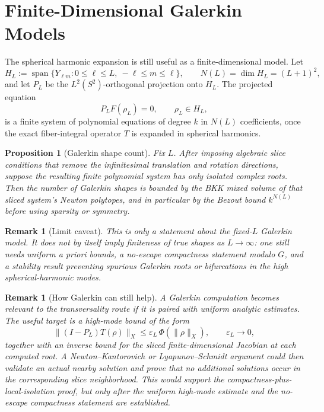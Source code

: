 \documentclass[12pt]{article}
\newtheorem{proposition}[theorem]{Proposition}
\newtheorem{remark}[theorem]{Remark}
\begin{document}
\section{Finite-Dimensional Galerkin Models}

The spherical harmonic expansion is still useful as a finite-dimensional
model. Let
\[
  H_L := \operatorname{span}\{Y_{\ell m}:0\leq \ell\leq L,\ -\ell\leq m\leq \ell\},
  \qquad N(L)=\dim H_L=(L+1)^2,
\]
and let $P_L$ be the $L^2(S^2)$-orthogonal projection onto $H_L$. The projected
equation
\[
  P_LF(\rho_L)=0,\qquad \rho_L\in H_L,
\]
is a finite system of polynomial equations of degree $k$ in $N(L)$
coefficients, once the exact fiber-integral operator $T$ is expanded in
spherical harmonics.

\begin{proposition}[Galerkin shape count]
  Fix $L$. After imposing algebraic slice conditions that remove the
  infinitesimal translation and rotation directions, suppose the resulting
  finite polynomial system has only isolated complex roots. Then the number of
  Galerkin shapes is bounded by the BKK mixed volume of that sliced system's
  Newton polytopes, and in particular by the Bezout bound $k^{N(L)}$ before
  using sparsity or symmetry.
\end{proposition}

\begin{remark}[Limit caveat]
  This is only a statement about the fixed-$L$ Galerkin model. It does not by
  itself imply finiteness of true shapes as $L\to\infty$: one still needs
  uniform a priori bounds, a no-escape compactness statement modulo $G$, and a
  stability result preventing spurious Galerkin roots or bifurcations in the
  high spherical-harmonic modes.
\end{remark}

\begin{remark}[How Galerkin can still help]
  A Galerkin computation becomes relevant to the transversality route if it is
  paired with uniform analytic estimates. The useful target is a high-mode
  bound of the form
  \[
    \|(I-P_L)T(\rho)\|_X \leq \varepsilon_L\,\Phi(\|\rho\|_X),
    \qquad \varepsilon_L\to 0,
  \]
  together with an inverse bound for the sliced finite-dimensional Jacobian at
  each computed root. A Newton--Kantorovich or Lyapunov--Schmidt argument could
  then validate an actual nearby solution and prove that no additional
  solutions occur in the corresponding slice neighborhood. This would support
  the compactness-plus-local-isolation proof, but only after the uniform
  high-mode estimate and the no-escape compactness statement are established.
\end{remark}
\end{document}
